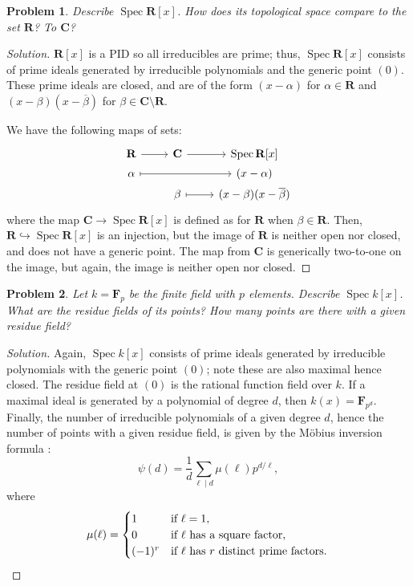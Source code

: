 \documentclass[12pt,letterpaper]{article}
\newtheorem{problem}{Problem}[section]
\theoremstyle{definition}
\theoremstyle{remark}
\numberwithin{equation}{section}
\numberwithin{figure}{problem}
\DeclareMathOperator{\Spec}{Spec}
\begin{document}
\begin{problem}
  Describe $\Spec \mathbf{R}[x]$. How does its topological space compare to the set $\mathbf{R}$? To $\mathbf{C}$?
\end{problem}
\begin{proof}[Solution]
  $\mathbf{R}[x]$ is a PID so all irreducibles are prime; thus, $\Spec \mathbf{R}[x]$ consists of prime ideals generated by irreducible polynomials and the generic point $(0)$. These prime ideals are closed, and are of the form $(x-\alpha)$ for $\alpha \in \mathbf{R}$ and $(x-\beta)(x-\overline{\beta})$ for $\beta \in \mathbf{C} \setminus \mathbf{R}$.
  \par We have the following maps of sets:
  \begin{equation*}
    \begin{tikzcd}[row sep=0em]
      \mathbf{R} \rar & \mathbf{C} \rar & \Spec\mathbf{R}[x]\\
      \alpha \arrow[mapsto]{rr} & & (x-\alpha)\\
      & \beta \arrow[mapsto]{r} & (x-\beta)(x-\overline{\beta})
    \end{tikzcd}
  \end{equation*}
  where the map $\mathbf{C} \to \Spec\mathbf{R}[x]$ is defined as for $\mathbf{R}$ when $\beta \in \mathbf{R}$. Then, $\mathbf{R} \hookrightarrow \Spec \mathbf{R}[x]$ is an injection, but the image of $\mathbf{R}$ is neither open nor closed, and does not have a generic point. The map from $\mathbf{C}$ is generically two-to-one on the image, but again, the image is neither open nor closed.
\end{proof}

\begin{problem}
  Let $k = \mathbf{F}_p$ be the finite field with $p$ elements. Describe $\Spec k[x]$. What are the residue fields of its points? How many points are there with a given residue field?
\end{problem}
\begin{proof}[Solution]
  Again, $\Spec k[x]$ consists of prime ideals generated by irreducible polynomials with the generic point $(0)$; note these are also maximal hence closed. The residue field at $(0)$ is the rational function field over $k$. If a maximal ideal is generated by a polynomial of degree $d$, then $k(x) = \mathbf{F}_{p^d}$. Finally, the number of irreducible polynomials of a given degree $d$, hence the number of points with a given residue field, is given by the M\"obius inversion formula \cite[p.~588]{DF04}:
  \begin{equation*}
    \psi(d) = \frac{1}{d} \sum_{\ell \mid d} \mu(\ell)p^{d/\ell},
  \end{equation*}
  where
  \begin{equation*}
    \mu(\ell) = \begin{cases}
      1 & \text{if}~\ell = 1,\\
      0 & \text{if $\ell$ has a square factor},\\
      (-1)^r & \text{if $\ell$ has $r$ distinct prime factors}.
    \end{cases}\qedhere
  \end{equation*}
\end{proof}
\end{document}
